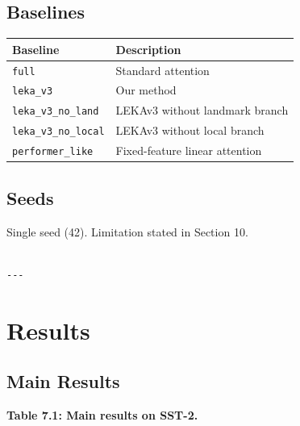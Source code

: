 \subsection{Baselines}

\begin{table}[H]
\centering
\small
\begin{tabular}{ll}
\toprule
\textbf{Baseline} & \textbf{Description} \\
\midrule
\texttt{full} & Standard attention \\
\texttt{leka\_v3} & Our method \\
\texttt{leka\_v3\_no\_land} & LEKAv3 without landmark branch \\
\texttt{leka\_v3\_no\_local} & LEKAv3 without local branch \\
\texttt{performer\_like} & Fixed-feature linear attention \\
\bottomrule
\end{tabular}
\end{table}

\subsection{Seeds}

Single seed (42). Limitation stated in Section 10.
\begin{lstlisting}

---
\end{lstlisting}

\section{Results}

\subsection{Main Results}

\textbf{Table 7.1: Main results on SST-2.}


